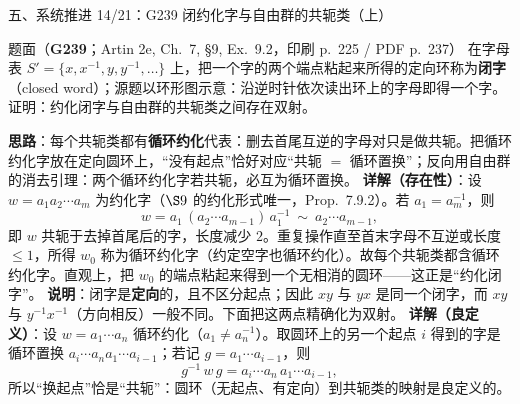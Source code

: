 \documentclass[aspectratio=169,10pt,fontset=none]{ctexbeamer}
\newcommand{\ex}[1]{\textcolor{accent}{\footnotesize\bfseries #1}}
\newcommand{\key}[1]{\textcolor{ink}{\bfseries #1}}
\begin{document}
\begin{frame}[t]{五、系统推进 14/21：G239 闭约化字与自由群的共轭类（上）}
\label{ex:G239}
\scriptsize
\begin{block}{\footnotesize 题面（\ex{G239}；Artin 2e, Ch.~7, §9, Ex.~9.2，印刷 p.~225 / PDF p.~237）}
在字母表 $S'=\{x,x^{-1},y,y^{-1},\ldots\}$ 上，把一个字的两个端点粘起来所得的定向环称为\textbf{闭字}（closed word）；源题以环形图示意：沿逆时针依次读出环上的字母即得一个字。证明：约化闭字与自由群的共轭类之间存在双射。
\end{block}
\key{思路}：每个共轭类都有\textbf{循环约化}代表：删去首尾互逆的字母对只是做共轭。把循环约化字放在定向圆环上，“没有起点”恰好对应“共轭 $=$ 循环置换”；反向用自由群的消去引理：两个循环约化字若共轭，必互为循环置换。
\key{详解（存在性）}：设 $w=a_1a_2\cdots a_m$ 为约化字（$\S9$ 的约化形式唯一，Prop.~7.9.2）。若 $a_1=a_m^{-1}$，则
\[ w=a_1\,(a_2\cdots a_{m-1})\,a_1^{-1}\ \sim\ a_2\cdots a_{m-1}, \]
即 $w$ 共轭于去掉首尾后的字，长度减少 $2$。重复操作直至首末字母不互逆或长度 $\le1$，所得 $w_0$ 称为循环约化字（约定空字也循环约化）。故每个共轭类都含循环约化字。直观上，把 $w_0$ 的端点粘起来得到一个无相消的圆环——这正是“约化闭字”。
\key{说明}：闭字是\textbf{定向}的，且不区分起点；因此 $xy$ 与 $yx$ 是同一个闭字，而 $xy$ 与 $y^{-1}x^{-1}$（方向相反）一般不同。下面把这两点精确化为双射。
\key{详解（良定义）}：设 $w=a_1\cdots a_n$ 循环约化（$a_1\ne a_n^{-1}$）。取圆环上的另一个起点 $i$ 得到的字是循环置换 $a_i\cdots a_na_1\cdots a_{i-1}$；若记 $g=a_1\cdots a_{i-1}$，则
\[ g^{-1}\,w\,g=a_i\cdots a_n\,a_1\cdots a_{i-1}, \]
所以“换起点”恰是“共轭”：圆环（无起点、有定向）到共轭类的映射是良定义的。
\end{frame}
\end{document}
